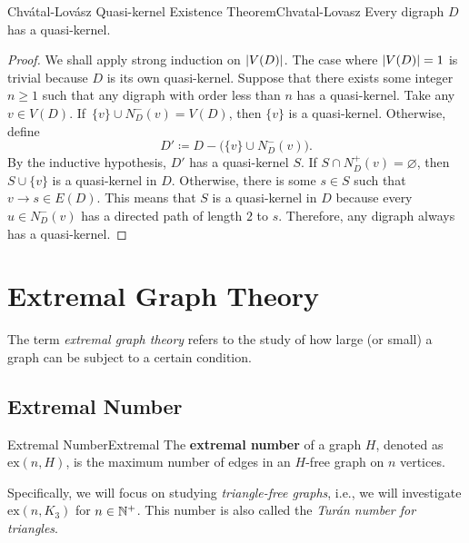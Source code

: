 \documentclass[math]{amznotes}
\theoremstyle{remark}
\newcommand{\ex}{\mathrm{ex}}
\begin{document}
\begin{thmbox}{Chv\'{a}tal-Lov\'{a}sz Quasi-kernel Existence Theorem}{Chvatal-Lovasz}
    Every digraph $D$ has a quasi-kernel.
    \tcblower
    \begin{proof}
        We shall apply strong induction on ${\left\lvert {V(D)} \right\rvert}$. The case where ${\left\lvert {V(D)} \right\rvert} = 1$ is trivial because $D$ is its own quasi-kernel. Suppose that there exists some integer $n \geq 1$ such that any digraph with order less than $n$ has a quasi-kernel. Take any $v \in V(D)$. If~$\{v\} \cup N_D^-(v) = V(D)$, then $\{v\}$ is a quasi-kernel. Otherwise, define 
        \begin{equation*}
            D' \coloneqq D - \bigl(\{v\} \cup N_D^-(v)\bigr).
        \end{equation*}
        By the inductive hypothesis, $D'$ has a quasi-kernel $S$. If $S \cap N_D^+(v) = \varnothing$, then $S \cup \{v\}$ is a quasi-kernel in $D$. Otherwise, there is some $s \in S$ such that $v \to s \in E(D)$. This means that $S$ is a quasi-kernel in $D$ because every $u \in N_D^-(v)$ has a directed path of length $2$ to $s$. Therefore, any digraph always has a quasi-kernel.
    \end{proof}
\end{thmbox}

\chapter{Extremal Graph Theory}
The term \textit{extremal graph theory} refers to the study of how large (or small) a graph can be subject to a certain condition.
\section{Extremal Number}
\begin{dfnbox}{Extremal Number}{Extremal}
    The {\color{red} \textbf{extremal number}} of a graph $H$, denoted as $\ex\left(n, H\right)$, is the maximum number of edges in an $H$-free graph on $n$ vertices.
\end{dfnbox}
Specifically, we will focus on studying \textit{triangle-free graphs}, i.e., we will investigate $\ex\left(n, K_3\right)$ for $n \in \mathbb{N}^+$. This number is also called the \textit{Tur\'{a}n number for triangles}.
\end{document}
